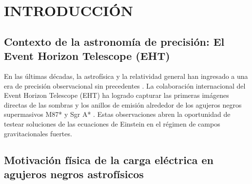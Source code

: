 \chapter{INTRODUCCIÓN}

\section{Contexto de la astronomía de precisión: El Event Horizon Telescope (EHT)}
En las últimas décadas, la astrofísica y la relatividad general han ingresado a una era de precisión observacional sin precedentes \citep{EHT_Paper1, EHT_Paper4}. La colaboración internacional del Event Horizon Telescope (EHT) ha logrado capturar las primeras imágenes directas de las sombras y los anillos de emisión alrededor de los agujeros negros supermasivos M87* y Sgr A* \citep{EHT_Paper1, EHT_Paper6}. Estas observaciones abren la oportunidad de testear soluciones de las ecuaciones de Einstein en el régimen de campos gravitacionales fuertes.



\section{Motivación física de la carga eléctrica en agujeros negros astrofísicos}

